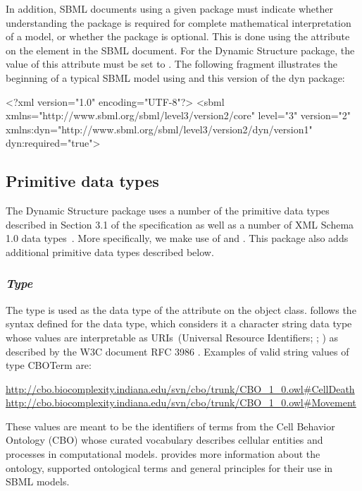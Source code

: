 \begin{center}
\end{center}

In addition, SBML documents using a given package must indicate whether
understanding the package is required for complete mathematical
interpretation of a model, or whether the package is optional.  This is
done using the attribute  on the  element in
the SBML document.  For the Dynamic Structure package, the value of
this attribute must be set to .
The following fragment illustrates the beginning of a typical SBML model
using \sbmlthreecore and this version of the dyn package:

\begin{example}
<?xml version="1.0" encoding="UTF-8"?>
<sbml xmlns="http://www.sbml.org/sbml/level3/version2/core" level="3" version="2"
     xmlns:dyn="http://www.sbml.org/sbml/level3/version2/dyn/version1" dyn:required="true">
\end{example}

\subsection{Primitive data types}
\label{subsec:primitives}
The Dynamic Structure package uses a number of the primitive data types described in Section 3.1 of the \sbmlthreecore specification as well as a number of XML Schema 1.0 data types~\citep{biron:2000}. More specifically, we make use of  and . This package also adds additional primitive data types described below.

\subsubsection{\emph{Type} }
\label{dat:CBOTerm}

The type  is used as the data type of the attribute  on the \Event object class.  follows the syntax defined for the  data type, which considers it a character string data type whose values are interpretable as URIs~(Universal Resource Identifiers; \citep{Means:2001}; \citep{w3c:2000b}) as described by the W3C document RFC 3986 \citep{Berners-Lee:2005}. Examples of valid string values of type CBOTerm are:  
\begin{center}
\url{http://cbo.biocomplexity.indiana.edu/svn/cbo/trunk/CBO_1_0.owl#CellDeath} \url{http://cbo.biocomplexity.indiana.edu/svn/cbo/trunk/CBO_1_0.owl#Movement}
\end{center}
These values are meant to be the identifiers of terms from the Cell Behavior Ontology (CBO) whose curated vocabulary describes cellular entities and processes in computational models.  provides more information about the ontology, supported ontological terms and general principles for their use in SBML models.

